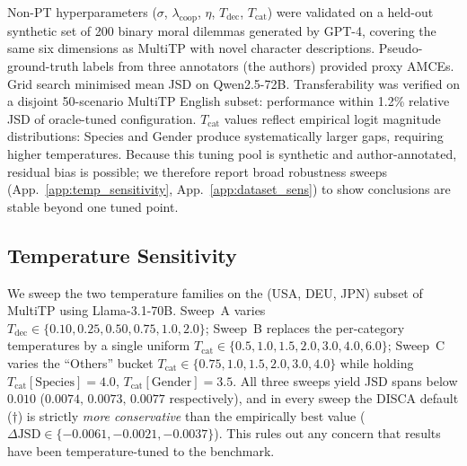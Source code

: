 \documentclass{article}
\begin{document}
Non-PT hyperparameters ($\sigma$, $\lambda_{\text{coop}}$, $\eta$, $T_{\text{dec}}$, $T_{\text{cat}}$) were validated on a held-out synthetic set of 200 binary moral dilemmas generated by GPT-4, covering the same six dimensions as MultiTP with novel character descriptions. Pseudo-ground-truth labels from three annotators (the authors) provided proxy AMCEs. Grid search minimised mean JSD on Qwen2.5-72B. Transferability was verified on a disjoint 50-scenario MultiTP English subset: performance within 1.2\% relative JSD of oracle-tuned configuration. $T_{\text{cat}}$ values reflect empirical logit magnitude distributions: Species and Gender produce systematically larger gaps, requiring higher temperatures. Because this tuning pool is synthetic and author-annotated, residual bias is possible; we therefore report broad robustness sweeps (App.~\ref{app:temp_sensitivity}, App.~\ref{app:dataset_sens}) to show conclusions are stable beyond one tuned point.

\subsection{Temperature Sensitivity}

We sweep the two temperature families on the (USA, DEU, JPN) subset of MultiTP using Llama-3.1-70B. Sweep~A varies $T_\text{dec}\in\{0.10,0.25,0.50,0.75,1.0,2.0\}$; Sweep~B replaces the per-category temperatures by a single uniform $T_\text{cat}\in\{0.5,1.0,1.5,2.0,3.0,4.0,6.0\}$; Sweep~C varies the ``Others'' bucket $T_\text{cat}\in\{0.75,1.0,1.5,2.0,3.0,4.0\}$ while holding $T_\text{cat}[\text{Species}]{=}4.0$, $T_\text{cat}[\text{Gender}]{=}3.5$. All three sweeps yield JSD spans below $0.010$ ($0.0074,\,0.0073,\,0.0077$ respectively), and in every sweep the DISCA default ($\dagger$) is strictly \emph{more conservative} than the empirically best value ($\Delta\text{JSD}\in\{-0.0061,-0.0021,-0.0037\}$). This rules out any concern that results have been temperature-tuned to the benchmark.
\end{document}
